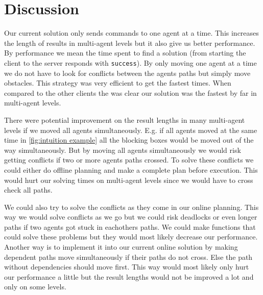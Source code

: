 \section{Discussion}
\label{sec:discussion}
Our current solution only sends commands to one agent at a time.
This increases the length of results in multi-agent levels but it also give us better performance.
By performance we mean the time spent to find a solution (from starting the client to the server responds with \texttt{success}).
By only moving one agent at a time we do not have to look for conflicts between the agents paths but simply move obstacles.
This strategy was very efficient to get the fastest times.
When compared to the other clients the was clear our solution was the fastest by far in multi-agent levels.

There were potential improvement on the result lengths in many multi-agent levels if we moved all agents simultaneously.
E.g. if all agents moved at the same time in \cref{fig:intuition example} all the blocking boxes would be moved out of the way simultaneously.
But by moving all agents simultaneously we would risk getting conflicts if two or more agents paths crossed.
To solve these conflicts we could either do offline planning and make a complete plan before execution.
This would hurt our solving times on multi-agent levels since we would have to cross check all paths.

We could also try to solve the conflicts as they come in our online planning.
This way we would solve conflicts as we go but we could risk deadlocks or even longer paths if two agents got stuck in eachothers paths.
We could make functions that could solve these problems but they would most likely decrease our performance.
Another way is to implement it into our current online solution by making dependent paths move simultaneously if their paths do not cross.
Else the path without dependencies should move first.
This way would most likely only hurt our performance a little but the result lengths would not be improved a lot and only on some levels.




